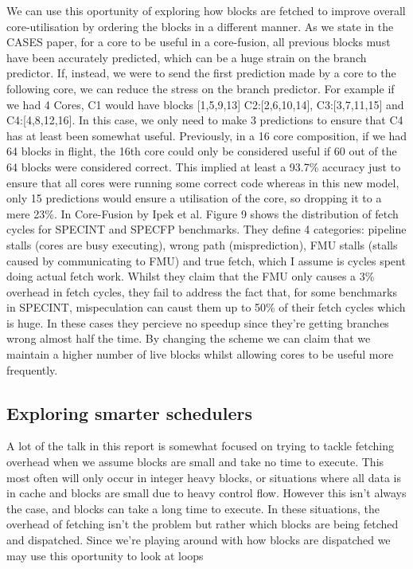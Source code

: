 We can use this oportunity of exploring how blocks are fetched to improve overall core-utilisation by ordering the blocks in a different manner.
As we state in the CASES paper, for a core to be useful in a core-fusion, all previous blocks must have been accurately predicted, which can be a huge strain on the branch predictor.
If, instead, we were to send the first prediction made by a core to the following core, we can reduce the stress on the branch predictor.
For example if we had 4 Cores, C1 would have blocks [1,5,9,13] C2:[2,6,10,14], C3:[3,7,11,15] and C4:[4,8,12,16].
In this case, we only need to make 3 predictions to ensure that C4 has at least been somewhat useful.
Previously, in a 16 core composition, if we had 64 blocks in flight, the 16th core could only be considered useful if 60 out of the 64 blocks were considered correct.
This implied at least a 93.7\% accuracy just to ensure that all cores were running some correct code whereas in this new model, only 15 predictions would ensure a utilisation of the core, so dropping it to a mere 23\%.
In Core-Fusion by Ipek et al. Figure 9 shows the distribution of fetch cycles for SPECINT and SPECFP benchmarks.
They define 4 categories: pipeline stalls (cores are busy executing), wrong path (misprediction), FMU stalls (stalls caused by communicating to FMU) and true fetch, which I assume is cycles spent doing actual fetch work.
Whilst they claim that the FMU only causes a 3\% overhead in fetch cycles, they fail to address the fact that, for some benchmarks in SPECINT, mispeculation can caust them up to 50\% of their fetch cycles which is huge.
In these cases they percieve no speedup since they're getting branches wrong almost half the time.
By changing the scheme we can claim that we maintain a higher number of live blocks whilst allowing cores to be useful more frequently.

\subsection{Exploring smarter schedulers}

A lot of the talk in this report is somewhat focused on trying to tackle fetching overhead when we assume blocks are small and take no time to execute.
This most often will only occur in integer heavy blocks, or situations where all data is in cache and blocks are small due to heavy control flow.
However this isn't always the case, and blocks can take a long time to execute.
In these situations, the overhead of fetching isn't the problem but rather which blocks are being fetched and dispatched.
Since we're playing around with how blocks are dispatched we may use this oportunity to look at loops 

